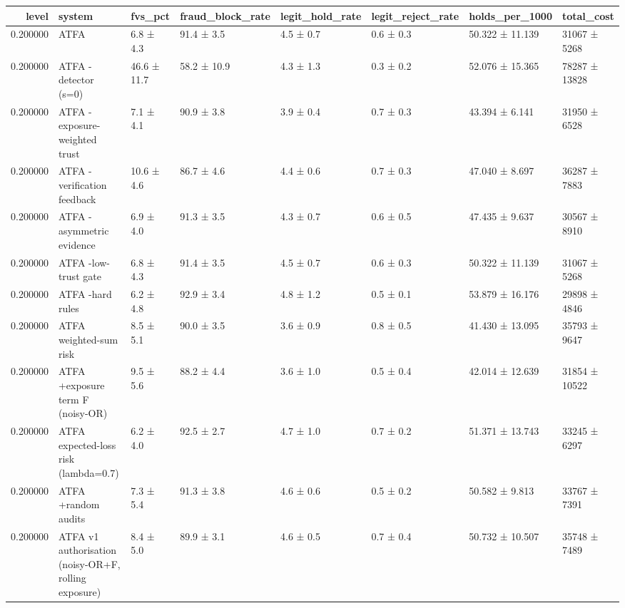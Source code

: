 \begin{tabular}{rlllllll}
\toprule
level & system & fvs\_pct & fraud\_block\_rate & legit\_hold\_rate & legit\_reject\_rate & holds\_per\_1000 & total\_cost \\
\midrule
0.200000 & ATFA & 6.8 ± 4.3 & 91.4 ± 3.5 & 4.5 ± 0.7 & 0.6 ± 0.3 & 50.322 ± 11.139 & 31067 ± 5268 \\
0.200000 & ATFA -detector (s=0) & 46.6 ± 11.7 & 58.2 ± 10.9 & 4.3 ± 1.3 & 0.3 ± 0.2 & 52.076 ± 15.365 & 78287 ± 13828 \\
0.200000 & ATFA -exposure-weighted trust & 7.1 ± 4.1 & 90.9 ± 3.8 & 3.9 ± 0.4 & 0.7 ± 0.3 & 43.394 ± 6.141 & 31950 ± 6528 \\
0.200000 & ATFA -verification feedback & 10.6 ± 4.6 & 86.7 ± 4.6 & 4.4 ± 0.6 & 0.7 ± 0.3 & 47.040 ± 8.697 & 36287 ± 7883 \\
0.200000 & ATFA -asymmetric evidence & 6.9 ± 4.0 & 91.3 ± 3.5 & 4.3 ± 0.7 & 0.6 ± 0.5 & 47.435 ± 9.637 & 30567 ± 8910 \\
0.200000 & ATFA -low-trust gate & 6.8 ± 4.3 & 91.4 ± 3.5 & 4.5 ± 0.7 & 0.6 ± 0.3 & 50.322 ± 11.139 & 31067 ± 5268 \\
0.200000 & ATFA -hard rules & 6.2 ± 4.8 & 92.9 ± 3.4 & 4.8 ± 1.2 & 0.5 ± 0.1 & 53.879 ± 16.176 & 29898 ± 4846 \\
0.200000 & ATFA weighted-sum risk & 8.5 ± 5.1 & 90.0 ± 3.5 & 3.6 ± 0.9 & 0.8 ± 0.5 & 41.430 ± 13.095 & 35793 ± 9647 \\
0.200000 & ATFA +exposure term F (noisy-OR) & 9.5 ± 5.6 & 88.2 ± 4.4 & 3.6 ± 1.0 & 0.5 ± 0.4 & 42.014 ± 12.639 & 31854 ± 10522 \\
0.200000 & ATFA expected-loss risk (lambda=0.7) & 6.2 ± 4.0 & 92.5 ± 2.7 & 4.7 ± 1.0 & 0.7 ± 0.2 & 51.371 ± 13.743 & 33245 ± 6297 \\
0.200000 & ATFA +random audits & 7.3 ± 5.4 & 91.3 ± 3.8 & 4.6 ± 0.6 & 0.5 ± 0.2 & 50.582 ± 9.813 & 33767 ± 7391 \\
0.200000 & ATFA v1 authorisation (noisy-OR+F, rolling exposure) & 8.4 ± 5.0 & 89.9 ± 3.1 & 4.6 ± 0.5 & 0.7 ± 0.4 & 50.732 ± 10.507 & 35748 ± 7489 \\
\bottomrule
\end{tabular}
